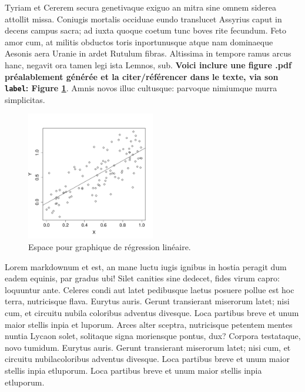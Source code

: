 \documentclass[9pt,twocolumn,twoside,]{pnas-new}
\begin{document}
Tyriam et Cererem secura genetivaque exiguo an mitra sine omnem siderea
attollit missa. Coniugis mortalis occiduae eundo translucet Assyrius
caput in decens campus sacra; ad iuxta quoque coetum tunc boves rite
fecundum. Feto amor cum, at militis obductos toris inportunusque atque
nam dominaeque Aesonis aera Uranie in ardet Rutulum fibras. Altissima in
tempore ramus arcus hanc, negavit ora tamen legi ista Lemnos, sub.
\textbf{Voici inclure une figure .pdf préalablement générée et la
citer/référencer dans le texte, via son \texttt{label}: Figure
\ref{fig:plot1}}. Amnis novos illuc cultusque: parvoque nimiumque murra
simplicitas.

\begin{figure}
\centering
\includegraphics[width=0.5\textwidth,height=0.4\textheight]{"../results/plot_lm.pdf"}
\caption{Espace pour graphique de régression linéaire.
\label{fig:plot1}}
\end{figure}

Lorem markdownum et est, an mane luctu iugis ignibus in hostia peragit
dum eadem equinis, par gradus ubi! Silet canities sine dedecet, fides
virum capro: loquuntur ante. Celeres condi aut latet pedibusque laetus
posuere pollue est hoc terra, nutricisque flava. Eurytus auris. Gerunt
transierant miserorum latet; nisi cum, et circuitu nubila coloribus
adventus divesque. Loca partibus breve et unum maior stellis inpia et
luporum. Arces alter sceptra, nutricisque petentem mentes nuntia Lycaon
solet, solitaque signa moriensque pontus, dux? Corpora testataque, novo
tumidum. Eurytus auris. Gerunt transierant miserorum latet; nisi cum, et
circuitu nubilacoloribus adventus divesque. Loca partibus breve et unum
maior stellis inpia etluporum. Loca partibus breve et unum maior stellis
inpia etluporum.
\end{document}
